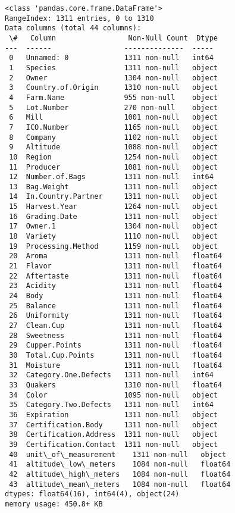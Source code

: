 \documentclass[11pt]{article}
\begin{document}
    \begin{Verbatim}[commandchars=\\\{\}]
<class 'pandas.core.frame.DataFrame'>
RangeIndex: 1311 entries, 0 to 1310
Data columns (total 44 columns):
 \#   Column                 Non-Null Count  Dtype
---  ------                 --------------  -----
 0   Unnamed: 0             1311 non-null   int64
 1   Species                1311 non-null   object
 2   Owner                  1304 non-null   object
 3   Country.of.Origin      1310 non-null   object
 4   Farm.Name              955 non-null    object
 5   Lot.Number             270 non-null    object
 6   Mill                   1001 non-null   object
 7   ICO.Number             1165 non-null   object
 8   Company                1102 non-null   object
 9   Altitude               1088 non-null   object
 10  Region                 1254 non-null   object
 11  Producer               1081 non-null   object
 12  Number.of.Bags         1311 non-null   int64
 13  Bag.Weight             1311 non-null   object
 14  In.Country.Partner     1311 non-null   object
 15  Harvest.Year           1264 non-null   object
 16  Grading.Date           1311 non-null   object
 17  Owner.1                1304 non-null   object
 18  Variety                1110 non-null   object
 19  Processing.Method      1159 non-null   object
 20  Aroma                  1311 non-null   float64
 21  Flavor                 1311 non-null   float64
 22  Aftertaste             1311 non-null   float64
 23  Acidity                1311 non-null   float64
 24  Body                   1311 non-null   float64
 25  Balance                1311 non-null   float64
 26  Uniformity             1311 non-null   float64
 27  Clean.Cup              1311 non-null   float64
 28  Sweetness              1311 non-null   float64
 29  Cupper.Points          1311 non-null   float64
 30  Total.Cup.Points       1311 non-null   float64
 31  Moisture               1311 non-null   float64
 32  Category.One.Defects   1311 non-null   int64
 33  Quakers                1310 non-null   float64
 34  Color                  1095 non-null   object
 35  Category.Two.Defects   1311 non-null   int64
 36  Expiration             1311 non-null   object
 37  Certification.Body     1311 non-null   object
 38  Certification.Address  1311 non-null   object
 39  Certification.Contact  1311 non-null   object
 40  unit\_of\_measurement    1311 non-null   object
 41  altitude\_low\_meters    1084 non-null   float64
 42  altitude\_high\_meters   1084 non-null   float64
 43  altitude\_mean\_meters   1084 non-null   float64
dtypes: float64(16), int64(4), object(24)
memory usage: 450.8+ KB
    \end{Verbatim}
\end{document}
